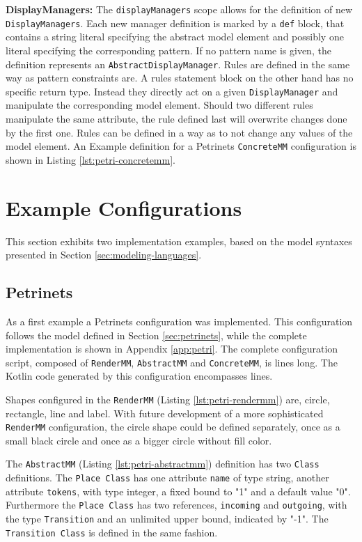 \textbf{DisplayManagers:} The \texttt{displayManagers} scope allows for the definition of new \texttt{DisplayManagers}. Each new manager definition is marked by a \texttt{def} block, that contains a string literal specifying the abstract model element and possibly one literal specifying the corresponding pattern. If no pattern name is given, the definition represents an \texttt{AbstractDisplayManager}. Rules are defined in the same way as pattern constraints are. A rules statement block on the other hand has no specific return type. Instead they directly act on a given \texttt{DisplayManager} and manipulate the corresponding model element. Should two different rules manipulate the same attribute, the rule defined last will overwrite changes done by the first one. Rules can be defined in a way as to not change any values of the model element. An Example definition for a Petrinets \texttt{ConcreteMM} configuration is shown in Listing \ref{lst:petri-concretemm}.

\section{Example Configurations}
\label{sec:example-configs}
This section exhibits two implementation examples, based on the model syntaxes presented in Section \ref{sec:modeling-languages}.

\subsection{Petrinets}
\label{sec:petri-impl}
As a first example a Petrinets configuration was implemented. This configuration follows the model defined in Section \ref{sec:petrinets}, while the complete implementation is shown in Appendix \ref{app:petri}. The complete configuration script, composed of \texttt{RenderMM}, \texttt{AbstractMM} and \texttt{ConcreteMM}, is \petriConfigLoC lines long. The Kotlin code generated by this configuration encompasses \petriGeneratedLoC lines. 

Shapes configured in the \texttt{RenderMM} (Listing \ref{lst:petri-rendermm}) are, circle, rectangle, line and label. With future development of a more sophisticated \texttt{RenderMM} configuration, the circle shape could be defined separately, once as a small black circle and once as a bigger circle without fill color. 

The \texttt{AbstractMM} (Listing \ref{lst:petri-abstractmm}) definition has two \texttt{Class} definitions. The \texttt{Place Class} has one attribute \texttt{name} of type string, another attribute \texttt{tokens}, with type integer, a fixed bound to "1" and a default value "0". Furthermore the \texttt{Place Class} has two references, \texttt{incoming} and \texttt{outgoing}, with the type \texttt{Transition} and an unlimited upper bound, indicated by "-1". The \texttt{Transition Class} is defined in the same fashion.

